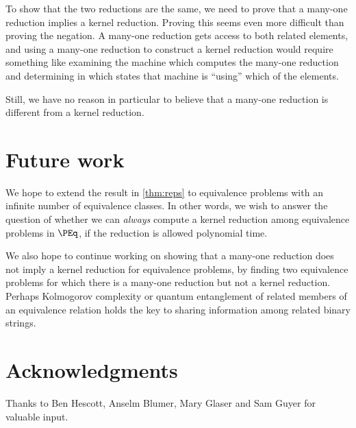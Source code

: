 \documentclass{article}
\theoremstyle{definition} \newtheorem{definition}[definition]{Definition}
\begin{document}
To show that the two reductions are the same, we need to prove that a many-one
reduction implies a kernel reduction. Proving this seems even more difficult
than proving the negation. A many-one reduction gets access to both related
elements, and using a many-one reduction to construct a kernel reduction would
require something like examining the machine which computes the many-one
reduction and determining in which states that machine is ``using'' which of
the elements.

Still, we have no reason in particular to believe that a many-one reduction is
different from a kernel reduction.

\section{Future work}

We hope to extend the result in \autoref{thm:reps} to equivalence problems with
an infinite number of equivalence classes. In other words, we wish to answer
the question of whether we can \emph{always} compute a kernel reduction among
equivalence problems in $\PEq$, if the reduction is allowed polynomial time.

We also hope to continue working on showing that a many-one reduction does not
imply a kernel reduction for equivalence problems, by finding two equivalence
problems for which there is a many-one reduction but not a kernel
reduction. Perhaps Kolmogorov complexity or quantum entanglement of related
members of an equivalence relation holds the key to sharing information among
related binary strings.

\section{Acknowledgments}

Thanks to Ben Hescott, Anselm Blumer, Mary Glaser and Sam Guyer for valuable
input.

 
\end{document}
